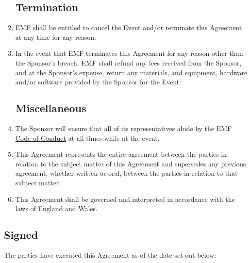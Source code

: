 \begin{enumerate}
\subsection*{Termination}

\item EMF shall be entitled to cancel the Event and/or terminate this Agreement at any
time for any reason.
\item In the event that EMF terminates this Agreement for any reason other than the Sponsor's
breach, EMF shall refund any fees received from the Sponsor, and at the Sponsor's expense,
return any materials, and equipment, hardware and/or software provided by the Sponsor for the Event.

\subsection*{Miscellaneous}

\item The Sponsor will ensure that all of its representatives abide by the EMF
        \href{https://www.emfcamp.org/code-of-conduct}{Code of Conduct} at all times while at the event.

\item This Agreement represents the entire agreement between the parties in relation to the subject
        matter of this Agreement and supersedes any previous agreement, whether written or oral,
        between the parties in relation to that subject matter.
\item This Agreement shall be governed and interpreted in accordance with the laws of England and Wales.

\end{enumerate}


\subsection*{Signed}
The parties have executed this Agreement as of the date set out below:



\newpage





